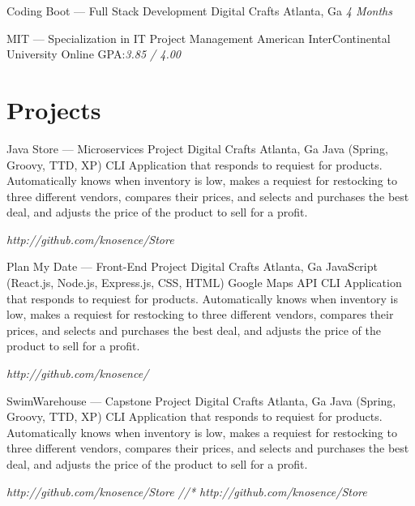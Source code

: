 \documentclass{resume-class/nadario_resume}
\begin{document}
        {Coding Boot --- Full Stack Development}
        {Digital Crafts}
        {Atlanta, Ga}
        {}{\textit{4 Months}}
        \vspace{.25cm}

        {MIT --- Specialization in IT Project Management}
        {American InterContinental University}
        {Online}
        {}{GPA:\textit{3.85 / 4.00}}
        \vspace{.25cm}

\section{Projects}
        {Java Store --- Microservices Project }
        {Digital Crafts}
        {Atlanta, Ga}
        {}{Java (Spring, Groovy, TTD, XP)}
          \indent CLI Application that responds to requiest for products. Automatically knows when
          inventory is low, makes a requiest for restocking to three different
          vendors, compares their prices, and selects and purchases the best
          deal, and adjusts the price of the product to sell for a profit.

        {}{\textit{http://github.com/knosence/Store}}
        \vspace{.25cm}

        {Plan My Date --- Front-End Project}
        {Digital Crafts}
        {Atlanta, Ga}
        {}{JavaScript (React.js, Node.js, Express.js, CSS, HTML) Google Maps API}
          \indent CLI Application that responds to requiest for products. Automatically knows when
          inventory is low, makes a requiest for restocking to three different
          vendors, compares their prices, and selects and purchases the best
          deal, and adjusts the price of the product to sell for a profit.

        {}{\textit{http://github.com/knosence/}}
        \vspace{.25cm}

        {SwimWarehouse --- Capstone Project}
        {Digital Crafts}
        {Atlanta, Ga}
        {}{Java (Spring, Groovy, TTD, XP)}
          \indent CLI Application that responds to requiest for products. Automatically knows when
          inventory is low, makes a requiest for restocking to three different
          vendors, compares their prices, and selects and purchases the best
          deal, and adjusts the price of the product to sell for a profit.

          {}{\textit{http://github.com/knosence/Store //* http://github.com/knosence/Store}}
\end{document}
